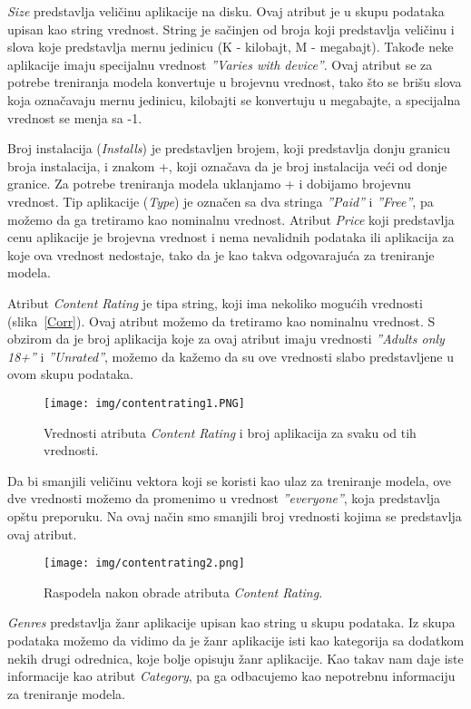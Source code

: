 \documentclass[a4paper,12pt,titlepage]{article}
\begin{document}
\emph{Size} predstavlja veličinu aplikacije na disku. Ovaj atribut je u skupu podataka upisan kao string vrednost. String je sačinjen od broja koji predstavlja veličinu i slova koje predstavlja mernu jedinicu (K - kilobajt, M - megabajt). Takođe neke aplikacije imaju specijalnu vrednost \emph{''Varies with device''}. Ovaj atribut se za potrebe treniranja modela konvertuje u brojevnu vrednost, tako što se brišu slova koja označavaju mernu jedinicu, kilobajti se konvertuju u megabajte, a specijalna vrednost se menja sa -1.

Broj instalacija (\emph{Installs}) je predstavljen brojem, koji predstavlja donju granicu broja instalacija, i znakom +, koji označava da je broj instalacija veći od donje granice. Za potrebe treniranja modela uklanjamo + i dobijamo brojevnu vrednost. Tip aplikacije (\emph{Type}) je označen sa dva stringa \emph{''Paid''} i \emph{''Free''}, pa možemo da ga tretiramo kao nominalnu vrednost. Atribut \emph{Price} koji predstavlja cenu aplikacije je brojevna vrednost i nema nevalidnih podataka ili aplikacija za koje ova vrednost nedostaje, tako da je kao takva odgovarajuća za treniranje modela.

Atribut \emph{Content Rating} je tipa string, koji ima nekoliko mogućih vrednosti (slika~\ref{Corr}). Ovaj atribut možemo da tretiramo kao nominalnu vrednost. S obzirom da je broj aplikacija koje za ovaj atribut imaju vrednosti \emph{''Adults only 18+''} i \emph{''Unrated''}, možemo da kažemo da su ove vrednosti slabo predstavljene u ovom skupu podataka. 

\begin{figure}[ht!]
\centering
\texttt{[image: img/contentrating1.PNG]}
\caption{Vrednosti atributa \emph{Content Rating} i broj aplikacija za svaku od tih vrednosti.}
\label{ContentRating}
\end{figure} 

Da bi smanjili veličinu vektora koji se koristi kao ulaz za treniranje modela, ove dve vrednosti možemo da promenimo u vrednost \emph{''everyone''}, koja predstavlja opštu preporuku. Na ovaj način smo smanjili broj vrednosti kojima se predstavlja ovaj atribut.

\begin{figure}[ht!]
\centering
\texttt{[image: img/contentrating2.png]}
\caption{Raspodela nakon obrade atributa \emph{Content Rating}.}
\label{ContentRating1}
\end{figure} 

\newpage
\emph{Genres} predstavlja žanr aplikacije upisan kao string u skupu podataka. Iz skupa podataka možemo da vidimo da je žanr aplikacije isti kao kategorija sa dodatkom nekih drugi odrednica, koje bolje opisuju žanr aplikacije. Kao takav nam daje iste informacije kao atribut \emph{Category}, pa ga odbacujemo kao nepotrebnu informaciju za treniranje modela. 
\end{document}

